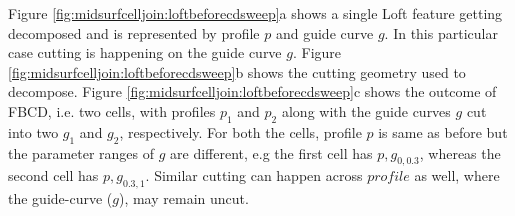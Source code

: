



Figure \ref{fig:midsurfcelljoin:loftbeforecdsweep}a shows a single Loft feature getting decomposed and is represented by profile $p$ and guide curve $g$. In this particular case cutting is happening on the guide curve $g$. Figure \ref{fig:midsurfcelljoin:loftbeforecdsweep}b shows the cutting geometry used to decompose. Figure \ref{fig:midsurfcelljoin:loftbeforecdsweep}c shows the outcome of FBCD, i.e. two cells, with profiles $p_1$ and $p_2$ along with the guide curves $g$ cut into two $g_1$ and $g_2$, respectively.  For both the cells, profile $p$ is same as before but the parameter ranges of $g$ are different, e.g the first cell has $p, g_{0,0.3}$, whereas the second cell has $p, g_{0.3,1}$. Similar cutting can happen across $profile$ as well, where the guide-curve ($g$), may remain uncut.


